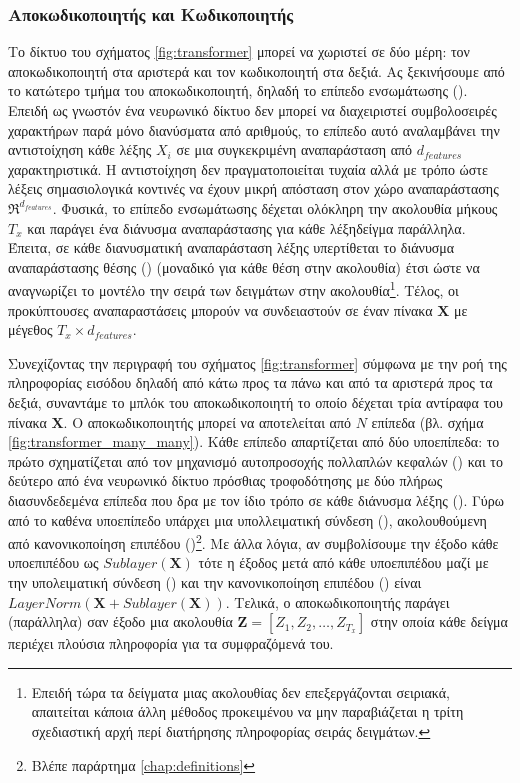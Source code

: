 \subsubsection{Αποκωδικοποιητής και Κωδικοποιητής}
Το δίκτυο του σχήματος \ref{fig:transformer} μπορεί να χωριστεί σε δύο μέρη: τον αποκωδικοποιητή στα αριστερά και τον κωδικοποιητή στα δεξιά. Ας ξεκινήσουμε από το κατώτερο τμήμα του αποκωδικοποιητή, δηλαδή το επίπεδο ενσωμάτωσης (). Επειδή ως γνωστόν ένα νευρωνικό δίκτυο δεν μπορεί να διαχειριστεί συμβολοσειρές χαρακτήρων παρά μόνο διανύσματα από αριθμούς, το επίπεδο αυτό αναλαμβάνει την αντιστοίχηση κάθε λέξης $X_i$ σε μια συγκεκριμένη αναπαράσταση από $d_{features}$ χαρακτηριστικά. Η αντιστοίχηση δεν πραγματοποιείται τυχαία αλλά με τρόπο ώστε λέξεις σημασιολογικά κοντινές να έχουν μικρή απόσταση στον χώρο αναπαράστασης $\Re^{d_{features}}$. Φυσικά, το επίπεδο ενσωμάτωσης δέχεται ολόκληρη την ακολουθία μήκους $T_x$ και παράγει ένα διάνυσμα αναπαράστασης για κάθε λέξη\textemdash δείγμα παράλληλα. Έπειτα, σε κάθε διανυσματική αναπαράσταση λέξης υπερτίθεται το διάνυσμα αναπαράστασης θέσης () (μοναδικό για κάθε θέση στην ακολουθία) έτσι ώστε να αναγνωρίζει το μοντέλο την σειρά των δειγμάτων στην ακολουθία\footnote{Επειδή τώρα τα δείγματα μιας ακολουθίας δεν επεξεργάζονται σειριακά, απαιτείται κάποια άλλη μέθοδος προκειμένου να μην παραβιάζεται η τρίτη σχεδιαστική αρχή περί διατήρησης πληροφορίας σειράς δειγμάτων.}. Τέλος, οι προκύπτουσες αναπαραστάσεις μπορούν να συνδειαστούν σε έναν πίνακα $\boldsymbol{X}$ με μέγεθος $T_x \times d_{features}$.\par

Συνεχίζοντας την περιγραφή του σχήματος \ref{fig:transformer} σύμφωνα με την ροή της πληροφορίας εισόδου δηλαδή από κάτω προς τα πάνω και από τα αριστερά προς τα δεξιά, συναντάμε το μπλόκ του αποκωδικοποιητή το οποίο δέχεται τρία αντίραφα του πίνακα $\boldsymbol{X}$. Ο αποκωδικοποιητής μπορεί να αποτελείται από $N$ επίπεδα (βλ. σχήμα \ref{fig:transformer_many_many}). Κάθε επίπεδο απαρτίζεται από δύο υπο\textendash επίπεδα: το πρώτο σχηματίζεται από τον μηχανισμό αυτο\textendash προσοχής πολλαπλών κεφαλών () και το δεύτερο από ένα νευρωνικό δίκτυο πρόσθιας τροφοδότησης με δύο πλήρως διασυνδεδεμένα επίπεδα που δρα με τον ίδιο τρόπο σε κάθε διάνυσμα λέξης (). Γύρω από το καθένα υπο\textendash επίπεδο υπάρχει μια υπολλειματική σύνδεση (), ακολουθούμενη από κανονικοποίηση επιπέδου ()\footnote{Βλέπε παράρτημα \ref{chap:definitions}}. Με άλλα λόγια, αν συμβολίσουμε την έξοδο κάθε υπο\textendash επιπέδου ως $Sublayer(\boldsymbol{X})$ τότε η έξοδος μετά από κάθε υποεπιπέδου μαζί με την υπολειματική σύνδεση () και την κανονικοποίηση επιπέδου () είναι $LayerNorm(\boldsymbol{X} + Sublayer(\boldsymbol{X}))$. Τελικά, ο αποκωδικοποιητής παράγει (παράλληλα) σαν έξοδο μια ακολουθία $\boldsymbol{Z} = [Z_1, Z_2, \dots, Z_{T_x}]$ στην οποία κάθε δείγμα περιέχει πλούσια πληροφορία για τα συμφραζόμενά του.\par


